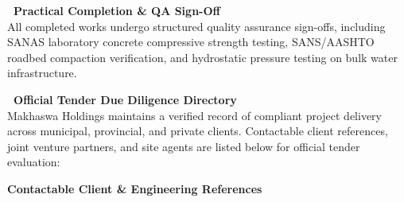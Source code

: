\documentclass[a4paper,11pt]{article}
\begin{document}
\noindent
\begin{minipage}[t]{0.485\textwidth}
    \begin{tcolorbox}[
        enhanced, colback=white, colframe=mhlightgray, boxrule=0.8pt, arc=4pt,
        left=9pt, right=9pt, top=8pt, bottom=8pt,
        borderline west={3pt}{0pt}{mhnavy}, drop shadow=black!3
    ]
        {\fontsize{9.5pt}{11.5pt}\selectfont\bfseries\color{mhnavy}\faCheckCircle\ Practical Completion \& QA Sign-Off}\\[2.5pt]
        {\fontsize{8.2pt}{11.2pt}\selectfont\color{mhtext}
        All completed works undergo structured quality assurance sign-offs, including SANAS laboratory concrete compressive strength testing, SANS/AASHTO roadbed compaction verification, and hydrostatic pressure testing on bulk water infrastructure.
        }
    \end{tcolorbox}
\end{minipage}
\hfill
\begin{minipage}[t]{0.485\textwidth}
    \begin{tcolorbox}[
        enhanced, colback=white, colframe=mhlightgray, boxrule=0.8pt, arc=4pt,
        left=9pt, right=9pt, top=8pt, bottom=8pt,
        borderline west={3pt}{0pt}{mhgold}, drop shadow=black!3
    ]
        {\fontsize{9.5pt}{11.5pt}\selectfont\bfseries\color{mhnavy}\faFileContract\ Official Tender Due Diligence Directory}\\[2.5pt]
        {\fontsize{8.2pt}{11.2pt}\selectfont\color{mhtext}
        Makhaswa Holdings maintains a verified record of compliant project delivery across municipal, provincial, and private clients. Contactable client references, joint venture partners, and site agents are listed below for official tender evaluation:
        }
    \end{tcolorbox}
\end{minipage}

\vfill

{\large\bfseries\color{mhnavy} Contactable Client \& Engineering References}
\vspace{0.12cm}
\end{document}
